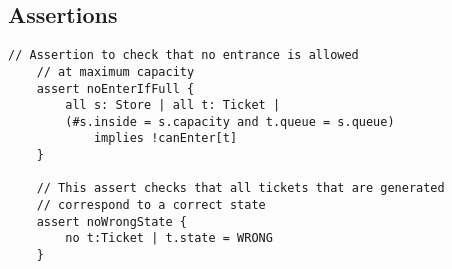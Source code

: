 
\subsection{Assertions}

\begin{lstlisting}[language=alloy]
	// Assertion to check that no entrance is allowed 
	// at maximum capacity
	assert noEnterIfFull {
		all s: Store | all t: Ticket |
		(#s.inside = s.capacity and t.queue = s.queue) 
			implies !canEnter[t]
	}
	
	// This assert checks that all tickets that are generated 
	// correspond to a correct state
	assert noWrongState {
		no t:Ticket | t.state = WRONG
	}
\end{lstlisting}